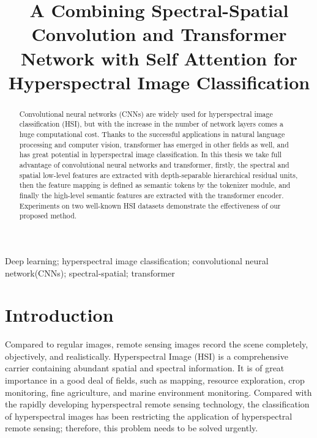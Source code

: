 \documentclass[]{interact}
\theoremstyle{plain}%
\theoremstyle{definition}
\theoremstyle{remark}
\begin{document}

\title{A Combining Spectral-Spatial Convolution and Transformer Network with Self Attention for Hyperspectral Image Classification}

\author{
}

\maketitle

\begin{abstract}
Convolutional neural networks (CNNs) are widely used for hyperspectral image classification (HSI), but with the increase in the number of network layers comes a huge computational cost. Thanks to the successful applications in natural language processing and computer vision, transformer has emerged in other fields as well, and has great potential in hyperspectral image classification. In this thesis we take full advantage of convolutional neural networks and transformer, firstly, the spectral and spatial low-level features are extracted with depth-separable hierarchical residual units, then the feature mapping is defined as semantic tokens by the tokenizer module, and finally the high-level semantic features are extracted with the transformer encoder. Experiments on two well-known HSI datasets demonstrate the effectiveness of our proposed method.
\end{abstract}

\begin{keywords}
Deep learning; hyperspectral image classification; convolutional neural network(CNNs); spectral-spatial; transformer
\end{keywords}

\section{Introduction}

Compared to regular images, remote sensing images record the scene completely, objectively, and realistically. Hyperspectral Image (HSI) is a comprehensive carrier containing abundant spatial and spectral information. It is of great importance in a good deal of fields, such as mapping, resource exploration, crop monitoring, fine agriculture, and marine environment monitoring. Compared with the rapidly developing hyperspectral remote sensing technology, the classification of hyperspectral images has been restricting the application of hyperspectral remote sensing; therefore, this problem needs to be solved urgently.
\end{document}
